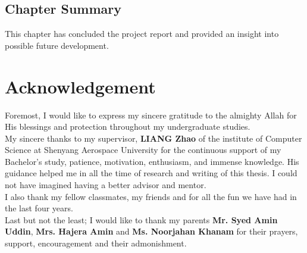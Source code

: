 \documentclass[12pt,a4paper]{article}
\newcommand\tab[1][1cm]{\hspace*{#1}}
\begin{document}
\subsection{Chapter Summary}	
\tab This chapter has concluded the project report and provided an insight into possible future development.
	


\newpage


\newpage
\section*{Acknowledgement}
	\tab Foremost, I would like to express my sincere gratitude to the almighty Allah for His blessings and protection throughout my undergraduate studies.\\ 
\tab My sincere thanks to my supervisor,  \textbf{LIANG Zhao} of the institute of Computer Science at Shenyang Aerospace University for the continuous support of my Bachelor's study, patience, motivation, enthusiasm, and immense knowledge. His guidance helped me in all the time of research and writing of this thesis. I could not have imagined having a better advisor and mentor.\\
        \tab I also thank my fellow classmates, my friends and for all the fun we have had in the last four years.\\
        \tab Last but not the least; I would like to thank my parents \textbf{Mr. Syed Amin Uddin}, \textbf{Mrs. Hajera Amin} and \textbf{Ms. Noorjahan Khanam} for their prayers, support, encouragement and their admonishment.\\
\end{document}
